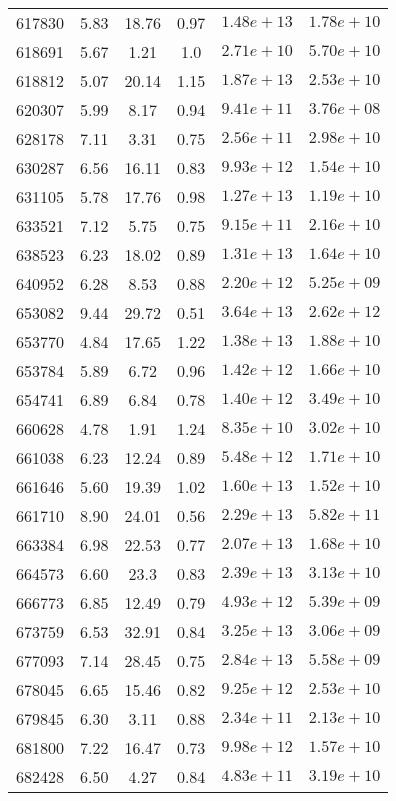 \begin{table}
\begin{tabular}{cccccc}
617830 & 5.83 & 18.76 & 0.97 & $1.48e+13$ & $1.78e+10$ \\
618691 & 5.67 & 1.21 & 1.0 & $2.71e+10$ & $5.70e+10$ \\
618812 & 5.07 & 20.14 & 1.15 & $1.87e+13$ & $2.53e+10$ \\
620307 & 5.99 & 8.17 & 0.94 & $9.41e+11$ & $3.76e+08$ \\
628178 & 7.11 & 3.31 & 0.75 & $2.56e+11$ & $2.98e+10$ \\
630287 & 6.56 & 16.11 & 0.83 & $9.93e+12$ & $1.54e+10$ \\
631105 & 5.78 & 17.76 & 0.98 & $1.27e+13$ & $1.19e+10$ \\
633521 & 7.12 & 5.75 & 0.75 & $9.15e+11$ & $2.16e+10$ \\
638523 & 6.23 & 18.02 & 0.89 & $1.31e+13$ & $1.64e+10$ \\
640952 & 6.28 & 8.53 & 0.88 & $2.20e+12$ & $5.25e+09$ \\
653082 & 9.44 & 29.72 & 0.51 & $3.64e+13$ & $2.62e+12$ \\
653770 & 4.84 & 17.65 & 1.22 & $1.38e+13$ & $1.88e+10$ \\
653784 & 5.89 & 6.72 & 0.96 & $1.42e+12$ & $1.66e+10$ \\
654741 & 6.89 & 6.84 & 0.78 & $1.40e+12$ & $3.49e+10$ \\
660628 & 4.78 & 1.91 & 1.24 & $8.35e+10$ & $3.02e+10$ \\
661038 & 6.23 & 12.24 & 0.89 & $5.48e+12$ & $1.71e+10$ \\
661646 & 5.60 & 19.39 & 1.02 & $1.60e+13$ & $1.52e+10$ \\
661710 & 8.90 & 24.01 & 0.56 & $2.29e+13$ & $5.82e+11$ \\
663384 & 6.98 & 22.53 & 0.77 & $2.07e+13$ & $1.68e+10$ \\
664573 & 6.60 & 23.3 & 0.83 & $2.39e+13$ & $3.13e+10$ \\
666773 & 6.85 & 12.49 & 0.79 & $4.93e+12$ & $5.39e+09$ \\
673759 & 6.53 & 32.91 & 0.84 & $3.25e+13$ & $3.06e+09$ \\
677093 & 7.14 & 28.45 & 0.75 & $2.84e+13$ & $5.58e+09$ \\
678045 & 6.65 & 15.46 & 0.82 & $9.25e+12$ & $2.53e+10$ \\
679845 & 6.30 & 3.11 & 0.88 & $2.34e+11$ & $2.13e+10$ \\
681800 & 7.22 & 16.47 & 0.73 & $9.98e+12$ & $1.57e+10$ \\
682428 & 6.50 & 4.27 & 0.84 & $4.83e+11$ & $3.19e+10$ \\

\end{tabular}
\end{table}
